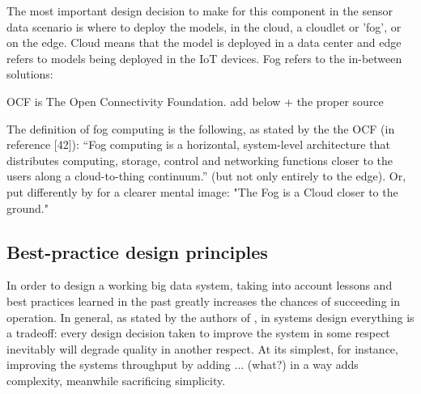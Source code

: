 The most important design decision to make for this component in the sensor data scenario is where to deploy the models, in the cloud, a cloudlet or 'fog', or on the edge. Cloud means that the model is deployed in a data center and edge refers to models being deployed in the IoT devices. Fog refers to the in-between solutions: 

OCF is The Open Connectivity Foundation. add below + the proper source

The definition of fog computing is the following, as stated by the the OCF (in \cite{fogsurvey} reference [42]): “Fog computing is a horizontal, system-level architecture that distributes computing, storage, control and networking functions closer to the users along a cloud-to-thing continuum.” (but not only entirely to the edge). Or, put differently by \cite{fogsurvey} for a clearer mental image: "The Fog is a Cloud closer to the ground."

\subsection{Best-practice design principles}








In order to design a working big data system, taking into account lessons and best practices learned in the past greatly increases the chances of succeeding in operation. In general, as stated by the authors of \cite{uber}, in systems design everything is a tradeoff: every design decision taken to improve the system in some respect inevitably will degrade quality in another respect. At its simplest, for instance, improving the systems throughput by adding ... (what?) in a way adds complexity, meanwhile sacrificing simplicity.

